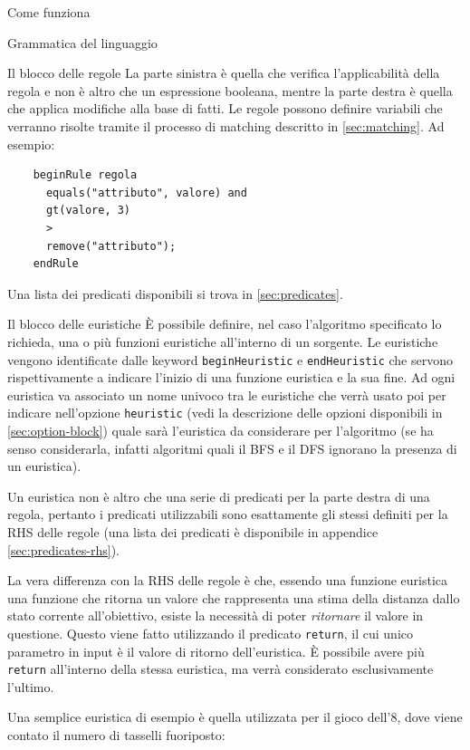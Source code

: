 \begin{chapter}{Come funziona}
\begin{section}{Grammatica del linguaggio}
\begin{subsection}{Il blocco delle regole}
	La parte sinistra \`e quella che verifica l'applicabilit\`a della regola e non \`e altro
	che un espressione booleana, mentre la parte destra \`e quella che applica modifiche
	alla base di fatti. Le regole possono definire variabili che verranno risolte tramite
	il processo di matching descritto in \ref{sec:matching}. Ad esempio:

	\begin{verbatim}
	beginRule regola
	  equals("attributo", valore) and
	  gt(valore, 3)
	  >
	  remove("attributo");
	endRule
	\end{verbatim}

	\noindent Una lista dei predicati disponibili si trova in \ref{sec:predicates}.
	\end{subsection}

	\begin{subsection}{Il blocco delle euristiche}
    \label{sec:heuristic-block}
    \`E possibile definire, nel caso l'algoritmo specificato lo richieda, una o pi\`u funzioni
    euristiche all'interno di un sorgente. Le euristiche vengono identificate dalle keyword
    \verb,beginHeuristic, e \verb,endHeuristic, che servono rispettivamente a indicare l'inizio di
    una funzione euristica e la sua fine. Ad ogni euristica va associato un nome univoco
    tra le euristiche che verr\`a usato poi per indicare nell'opzione \verb,heuristic,
    (vedi la descrizione delle opzioni disponibili in \ref{sec:option-block})
    quale sar\`a l'euristica da considerare per l'algoritmo (se ha senso considerarla, infatti
    algoritmi quali il BFS e il DFS ignorano la presenza di un euristica).

    Un euristica non \`e altro che una serie di predicati per la parte destra di una regola,
    pertanto i predicati utilizzabili sono esattamente gli stessi definiti per la RHS delle 
    regole (una lista dei predicati \`e disponibile in appendice \ref{sec:predicates-rhs}).

    La vera differenza con la RHS delle regole \`e che, essendo una funzione euristica una
    funzione che ritorna un valore che rappresenta una stima della distanza dallo stato corrente
    all'obiettivo, esiste la necessit\`a di poter \textit{ritornare} il valore in questione.
    Questo viene fatto utilizzando il predicato \verb,return,, il cui unico parametro in
    input \`e il valore di ritorno dell'euristica. \`E possibile avere pi\`u \verb,return,
    all'interno della stessa euristica, ma verr\`a considerato esclusivamente l'ultimo.

    Una semplice euristica di esempio \`e quella utilizzata per il gioco dell'8, dove viene
    contato il numero di tasselli fuoriposto:


\end{subsection}
\end{section}
\end{chapter}
